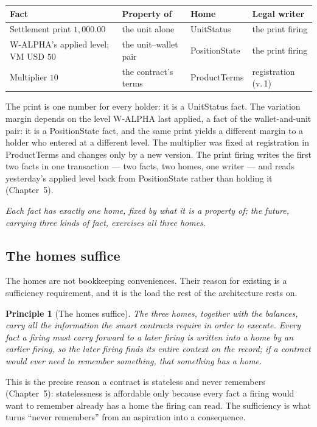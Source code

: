 \documentclass[11pt,a4paper]{article}
\newcommand{\USD}[1]{\mbox{USD~#1}}
\newtheorem{principle}[definition]{Principle}
\begin{document}
\begin{center}
\begin{tabular}{llll}
\toprule
Fact & Property of & Home & Legal writer \\
\midrule
Settlement print $1{,}000.00$        & the unit alone         & UnitStatus    & the print firing \\
W-ALPHA's applied level; VM $\USD{50}$ & the unit--wallet pair & PositionState & the print firing \\
Multiplier $10$                      & the contract's terms   & ProductTerms  & registration (v.\,1) \\
\bottomrule
\end{tabular}
\end{center}

The print is one number for every holder: it is a UnitStatus fact. The variation margin
depends on the level W-ALPHA last applied, a fact of the wallet-and-unit pair: it is a
PositionState fact, and the same print yields a different margin to a holder who entered
at a different level. The multiplier was fixed at registration in ProductTerms and changes
only by a new version. The print firing writes the first two facts in one transaction ---
two facts, two homes, one writer --- and reads yesterday's applied level back from
PositionState rather than holding it (Chapter~5).

\emph{Each fact has exactly one home, fixed by what it is a property of; the future,
carrying three kinds of fact, exercises all three homes.}

\subsection{The homes suffice}

The homes are not bookkeeping conveniences. Their reason for existing is a sufficiency
requirement, and it is the load the rest of the architecture rests on.

\begin{principle}[The homes suffice]\label{prin:sufficiency}
The three homes, together with the balances, carry all the information the smart contracts
require in order to execute. Every fact a firing must carry forward to a later firing is
written into a home by an earlier firing, so the later firing finds its entire context on
the record; if a contract would ever need to remember something, that something has a
home.
\end{principle}

This is the precise reason a contract is stateless and never remembers
(Chapter~5): statelessness is affordable only because every fact a firing
would want to remember already has a home the firing can read. The sufficiency is what
turns ``never remembers'' from an aspiration into a consequence.
\end{document}
